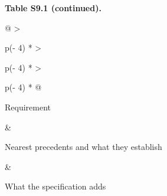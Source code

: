 \documentclass[
  11pt,
]{article}
\begin{document}
\begin{table}[!tp]
\textbf{Table S9.1 (continued).}\par\smallskip
{\footnotesize
\begin{tabular}{@{}
  >{\raggedright\arraybackslash}p{(\columnwidth - 4\tabcolsep) * }
  >{\raggedright\arraybackslash}p{(\columnwidth - 4\tabcolsep) * }
  >{\raggedright\arraybackslash}p{(\columnwidth - 4\tabcolsep) * }@{}}
\toprule\noalign{}
\begin{minipage}[b]{\linewidth}\raggedright
Requirement
\end{minipage} & \begin{minipage}[b]{\linewidth}\raggedright
Nearest precedents and what they establish
\end{minipage} & \begin{minipage}[b]{\linewidth}\raggedright
What the specification adds
\end{minipage} \\
\midrule\noalign{}


\end{tabular}}
\end{table}
\end{document}
